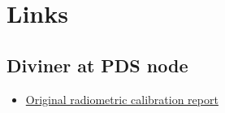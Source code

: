 \section{Links}

\subsection{Diviner at PDS node}

\begin{itemize}
\item \href{http://pds-geosciences.wustl.edu/lro/lro-l-dlre-4-rdr-v1/lrodlr_1001/calib/radiometric/dlre_radiometric_cal_report.pdf}{Original radiometric calibration report}
\end{itemize}